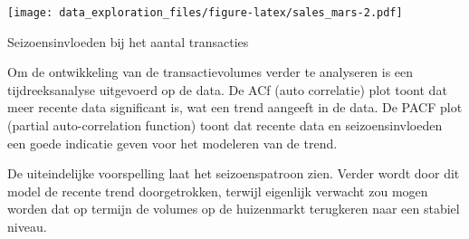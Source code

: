 \documentclass[
]{article}
\newenvironment{Shaded}{\begin{snugshade}}{\end{snugshade}}
\newcommand{\CommentTok}[1]{\textcolor[rgb]{0.56,0.35,0.01}{\textit{#1}}}
\newcommand{\DataTypeTok}[1]{\textcolor[rgb]{0.13,0.29,0.53}{#1}}
\newcommand{\DecValTok}[1]{\textcolor[rgb]{0.00,0.00,0.81}{#1}}
\newcommand{\KeywordTok}[1]{\textcolor[rgb]{0.13,0.29,0.53}{\textbf{#1}}}
\newcommand{\NormalTok}[1]{#1}
\newcommand{\OperatorTok}[1]{\textcolor[rgb]{0.81,0.36,0.00}{\textbf{#1}}}
\newcommand{\StringTok}[1]{\textcolor[rgb]{0.31,0.60,0.02}{#1}}
\begin{document}
\texttt{[image: data\_exploration\_files/figure-latex/sales\_mars-2.pdf]}

Seizoensinvloeden bij het aantal transacties

Om de ontwikkeling van de transactievolumes verder te analyseren is een
tijdreeksanalyse uitgevoerd op de data. De ACf (auto correlatie) plot
toont dat meer recente data significant is, wat een trend aangeeft in de
data. De PACF plot (partial auto-correlation function) toont dat recente
data en seizoensinvloeden een goede indicatie geven voor het modeleren
van de trend.

De uiteindelijke voorspelling laat het seizoenspatroon zien. Verder
wordt door dit model de recente trend doorgetrokken, terwijl eigenlijk
verwacht zou mogen worden dat op termijn de volumes op de huizenmarkt
terugkeren naar een stabiel niveau.

\begin{Shaded}
\end{Shaded}
\end{document}
